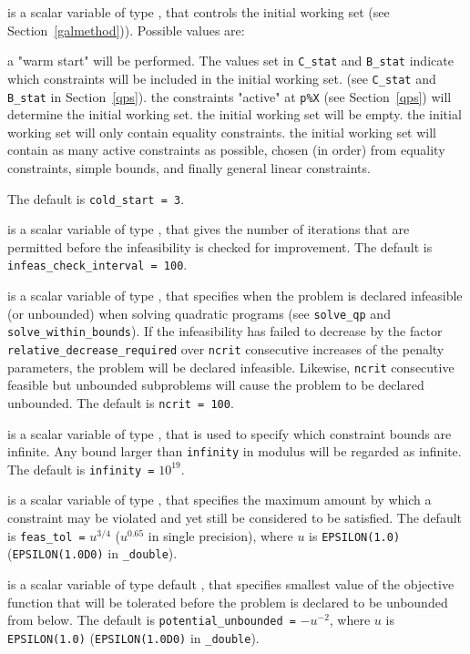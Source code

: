 \begin{description}
 is a scalar variable of type \integer, that controls
the initial working set (see Section~\ref{galmethod})). Possible values are:
\begin{description}
 a "warm start" will be performed. The values set in
     {\tt C\_stat} and {\tt B\_stat} indicate which
     constraints will be included in the initial working set.
     (see {\tt C\_stat} and {\tt B\_stat} in Section~\ref{qps}).
 the constraints "active" at {\tt p\%X} (see Section~\ref{qps})
     will determine the initial working set.
 the initial working set will be empty.
 the initial working set will only contain equality constraints.
 the initial working set will contain as many active constraints as
     possible, chosen (in order) from equality constraints, simple bounds, and
     finally general linear constraints.
\end{description}
The default is {\tt cold\_start = 3}.

 is a scalar variable of type \integer,
that gives the number of iterations that are permitted before the
infeasibility is checked for improvement.
The default is {\tt infeas\_check\_interval = 100}.

 is a scalar variable of type \integer,
that specifies when the problem is declared infeasible
(or unbounded) when solving quadratic programs (see {\tt solve\_qp} and
{\tt solve\_within\_bounds}). If the infeasibility has failed to
decrease by the factor {\tt relative\_decrease\_required} over
{\tt ncrit} consecutive increases of the penalty parameters, the
problem will be declared infeasible. Likewise, {\tt ncrit} consecutive
feasible but unbounded subproblems will cause the problem to be declared
unbounded.
The default is {\tt ncrit = 100}.

 is a scalar variable of type \realdp, that is used to
specify which constraint bounds are infinite.
Any bound larger than {\tt infinity} in modulus will be regarded as infinite.
The default is {\tt infinity =} $10^{19}$.

 is a scalar variable of type \realdp, that specifies the
maximum amount by which a constraint may be violated and yet still be
considered to be satisfied.
The default is {\tt feas\_tol =} $u^{3/4}$ ($u^{0.65}$ in
single precision),
where $u$ is {\tt EPSILON(1.0)} ({\tt EPSILON(1.0D0)} in
{\tt \fullpackagename\_dou\-ble}).

  is a scalar variable of type default
\realdp, that specifies smallest
value of the objective function that will be tolerated before the problem
is declared to be unbounded from below.
The default is {\tt potential\_u\-nbounded =} $-u^{-2}$,
where $u$ is {\tt EPSILON(1.0)} ({\tt EPSILON(1.0D0)} in
{\tt \fullpackagename\_double}).


\end{description}
